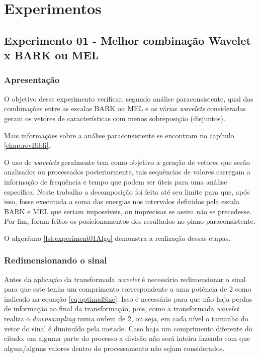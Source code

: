 	\section{Experimentos}
		\subsection{Experimento 01 - Melhor combinação Wavelet x BARK ou MEL}
		\label{chap:propApproach:sec:Experimento01}
			\subsubsection{Apresentação}
				\par O objetivo desse experimento verificar, segundo análise paraconsistente, qual das combinações entre as escalas BARK ou MEL e as várias \textit{wavelets} consideradas geram os vetores de características com menos sobreposição (disjuntos).
				
				\par Mais informações sobre a análise paraconsistente se encontram no capítulo \ref{chap:revBibli}. 
				
				\par O uso de \textit{wavelets} geralmente tem como objetivo a geração de vetores que serão analisados ou processados posteriormente, tais sequências de valores carregam a informação de frequência e tempo que podem ser úteis para uma análise específica. Neste trabalho a decomposição foi feita até seu limite  para que, após isso, fosse executada a soma das energias nos intervalos definidos pela escala BARK e MEL que seriam impossíveis, ou imprecisas se assim não se precedesse. Por fim, foram  feitos os posicionamentos dos resultados no plano paraconsistente.
				
				\par O algoritmo \ref{lst:experiment01Algo} demonstra a realização dessas etapas.
			
			\subsubsection{Redimensionando o sinal}
				\par Antes da aplicação da transformada \textit{wavelet} é necessário redimensionar o sinal para que este tenha um comprimento correspondente a uma potência de 2 como indicado na equação \ref{eq:optimalSize}. Isso é necessário para que não haja perdas de informação ao final da transformação, pois, como a transformada \textit{wavelet} realiza o \textit{downsampling} numa ordem de 2, ou seja, em cada nível o tamanho do vetor do sinal é diminuído pela metade. Caso haja um comprimento diferente do citado, em alguma parte do processo a divisão não será inteira fazendo com que algum/alguns valores dentro do processamento não sejam considerados.
				
